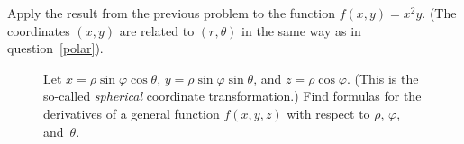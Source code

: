 \documentclass[12pt]{exam}
\theoremstyle{definition}
\begin{document}
\begin{questions}

\question Apply the result from the previous problem to the function $f(x, y) = x^2 y$. (The coordinates $(x,y)$ are related to $(r,\theta)$ in the same way as in question~\ref{polar}).


\begin{figure}[ht]
\begin{minipage}[t]{0.7\linewidth}
\question Let $x = \rho \sin \varphi \cos \theta$, $y = \rho \sin \varphi \sin \theta$, and $z = \rho \cos \varphi$. (This is the so-called \emph{spherical} coordinate transformation.) Find formulas for the derivatives of a general function $f(x, y, z)$ with respect to $\rho$, $\varphi$, and~$\theta$. 
\end{minipage} \hspace*{1cm}
\begin{minipage}[t]{0.25\linewidth}
\hfill
\end{minipage}
\end{figure}


\end{questions} 
\end{document}
